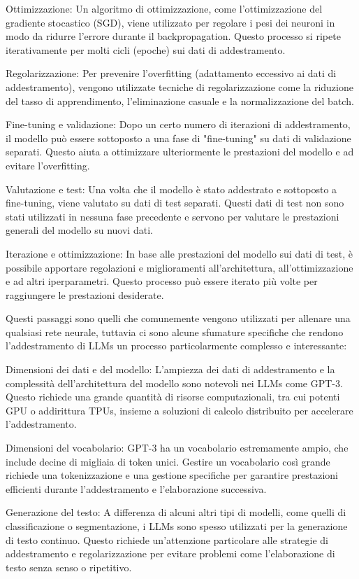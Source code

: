 Ottimizzazione: Un algoritmo di ottimizzazione, come l'ottimizzazione del gradiente stocastico (SGD), viene utilizzato per regolare i pesi dei neuroni in modo da ridurre l'errore durante il backpropagation. Questo processo si ripete iterativamente per molti cicli (epoche) sui dati di addestramento.

Regolarizzazione: Per prevenire l'overfitting (adattamento eccessivo ai dati di addestramento), vengono utilizzate tecniche di regolarizzazione come la riduzione del tasso di apprendimento, l'eliminazione casuale e la normalizzazione del batch.

Fine-tuning e validazione: Dopo un certo numero di iterazioni di addestramento, il modello può essere sottoposto a una fase di "fine-tuning" su dati di validazione separati. Questo aiuta a ottimizzare ulteriormente le prestazioni del modello e ad evitare l'overfitting.

Valutazione e test: Una volta che il modello è stato addestrato e sottoposto a fine-tuning, viene valutato su dati di test separati. Questi dati di test non sono stati utilizzati in nessuna fase precedente e servono per valutare le prestazioni generali del modello su nuovi dati.

Iterazione e ottimizzazione: In base alle prestazioni del modello sui dati di test, è possibile apportare regolazioni e miglioramenti all'architettura, all'ottimizzazione e ad altri iperparametri. Questo processo può essere iterato più volte per raggiungere le prestazioni desiderate.

Questi passaggi sono quelli che comunemente vengono utilizzati per allenare una qualsiasi rete neurale, tuttavia ci sono alcune sfumature specifiche che rendono l'addestramento di LLMs un processo particolarmente complesso e interessante:


Dimensioni dei dati e del modello: L'ampiezza dei dati di addestramento e la complessità dell'architettura del modello sono notevoli nei LLMs come GPT-3. Questo richiede una grande quantità di risorse computazionali, tra cui potenti GPU o addirittura TPUs, insieme a soluzioni di calcolo distribuito per accelerare l'addestramento.

Dimensioni del vocabolario: GPT-3 ha un vocabolario estremamente ampio, che include decine di migliaia di token unici. Gestire un vocabolario così grande richiede una tokenizzazione e una gestione specifiche per garantire prestazioni efficienti durante l'addestramento e l'elaborazione successiva.

Generazione del testo: A differenza di alcuni altri tipi di modelli, come quelli di classificazione o segmentazione, i LLMs sono spesso utilizzati per la generazione di testo continuo. Questo richiede un'attenzione particolare alle strategie di addestramento e regolarizzazione per evitare problemi come l'elaborazione di testo senza senso o ripetitivo.

